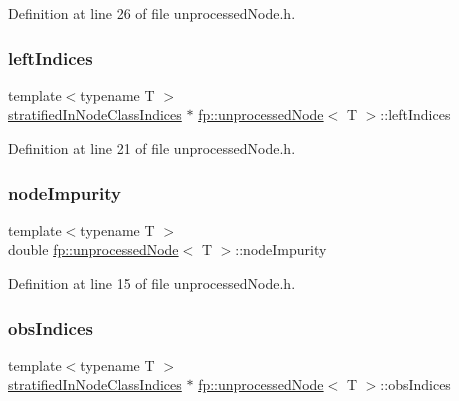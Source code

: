 Definition at line 26 of file unprocessed\+Node.\+h.

\mbox{\label{classfp_1_1unprocessedNode_a8e39fa0144bbb78fd02d1973bd05b5f6}} 
\subsubsection{\texorpdfstring{left\+Indices}{leftIndices}}
{\footnotesize\ttfamily template$<$typename T $>$ \\
\hyperlink{classfp_1_1stratifiedInNodeClassIndices}{stratified\+In\+Node\+Class\+Indices} $\ast$ \hyperlink{classfp_1_1unprocessedNode}{fp\+::unprocessed\+Node}$<$ T $>$\+::left\+Indices\hspace{0.3cm}{\ttfamily [protected]}}



Definition at line 21 of file unprocessed\+Node.\+h.

\mbox{\label{classfp_1_1unprocessedNode_a5bb6906b09625f7893bf0ffd512b1714}} 
\subsubsection{\texorpdfstring{node\+Impurity}{nodeImpurity}}
{\footnotesize\ttfamily template$<$typename T $>$ \\
double \hyperlink{classfp_1_1unprocessedNode}{fp\+::unprocessed\+Node}$<$ T $>$\+::node\+Impurity\hspace{0.3cm}{\ttfamily [protected]}}



Definition at line 15 of file unprocessed\+Node.\+h.

\mbox{\label{classfp_1_1unprocessedNode_aba9f03124658f62906fa8ded53cef535}} 
\subsubsection{\texorpdfstring{obs\+Indices}{obsIndices}}
{\footnotesize\ttfamily template$<$typename T $>$ \\
\hyperlink{classfp_1_1stratifiedInNodeClassIndices}{stratified\+In\+Node\+Class\+Indices} $\ast$ \hyperlink{classfp_1_1unprocessedNode}{fp\+::unprocessed\+Node}$<$ T $>$\+::obs\+Indices\hspace{0.3cm}{\ttfamily [protected]}}



